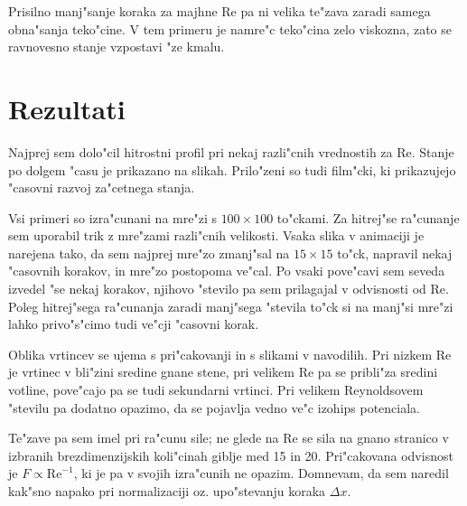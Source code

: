 \documentclass[a4paper,10pt]{article}
\begin{document}
Prisilno manj"sanje koraka za majhne Re pa ni velika te"zava zaradi samega obna"sanja teko"cine. V tem primeru je namre"c teko"cina zelo viskozna, zato se ravnovesno stanje vzpostavi "ze kmalu. 

\section{Rezultati}

Najprej sem dolo"cil hitrostni profil pri nekaj razli"cnih vrednostih za Re. Stanje po dolgem "casu je prikazano na slikah. Prilo"zeni so tudi film"cki, ki prikazujejo "casovni razvoj za"cetnega stanja. 

Vsi primeri so izra"cunani na mre"zi s $100\times 100$ to"ckami. Za hitrej"se ra"cunanje sem uporabil trik z mre"zami razli"cnih velikosti. Vsaka slika v animaciji je narejena tako, da sem najprej mre"zo zmanj"sal na $15\times 15$ to"ck, napravil nekaj "casovnih korakov, in mre"zo postopoma ve"cal. Po vsaki pove"cavi sem seveda izvedel "se nekaj korakov, njihovo "stevilo pa sem prilagajal v odvisnosti od Re. Poleg hitrej"sega ra"cunanja zaradi manj"sega "stevila to"ck si na manj"si mre"zi lahko privo"s"cimo tudi ve"cji "casovni korak. 

\begin{figure}[H]
\subfigure[$\mathrm{Re} = 10$, $T = 0.82$]{\scalebox{0.7}{}}
\subfigure[$\mathrm{Re} = 100$, $T = 1.53$]{\scalebox{0.7}{}}
\subfigure[$\mathrm{Re} = 1000$, $T = 2.39$]{\scalebox{0.7}{}}
\subfigure[$\mathrm{Re} = 1000$, $T = 21.9$]{\scalebox{0.7}{}}
\end{figure}

Oblika vrtincev se ujema s pri"cakovanji in s slikami v navodilih. Pri nizkem Re je vrtinec v bli"zini sredine gnane stene, pri velikem Re pa se pribli"za sredini votline, pove"cajo pa se tudi sekundarni vrtinci. Pri velikem Reynoldsovem "stevilu pa dodatno opazimo, da se pojavlja vedno ve"c izohips potenciala. 

Te"zave pa sem imel pri ra"cunu sile; ne glede na Re se sila na gnano stranico v izbranih brezdimenzijskih koli"cinah giblje med 15 in 20. Pri"cakovana odvisnost je $F \propto \mathrm{Re}^{-1}$, ki je pa v svojih izra"cunih ne opazim. Domnevam, da sem naredil kak"sno napako pri normalizaciji oz. upo"stevanju koraka $\Delta x$. 
\end{document}
